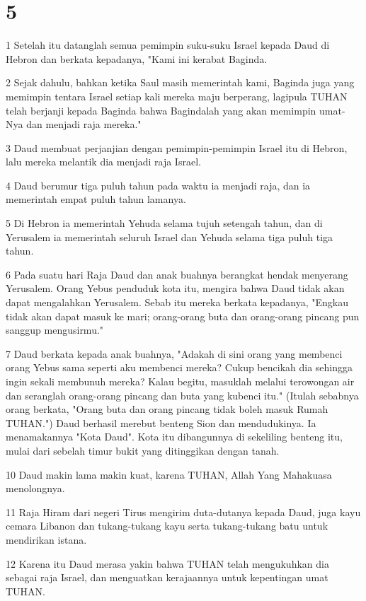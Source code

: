 \chapter{5}

\par 1 Setelah itu datanglah semua pemimpin suku-suku Israel kepada Daud di Hebron dan berkata kepadanya, "Kami ini kerabat Baginda.
\par 2 Sejak dahulu, bahkan ketika Saul masih memerintah kami, Baginda juga yang memimpin tentara Israel setiap kali mereka maju berperang, lagipula TUHAN telah berjanji kepada Baginda bahwa Bagindalah yang akan memimpin umat-Nya dan menjadi raja mereka."
\par 3 Daud membuat perjanjian dengan pemimpin-pemimpin Israel itu di Hebron, lalu mereka melantik dia menjadi raja Israel.
\par 4 Daud berumur tiga puluh tahun pada waktu ia menjadi raja, dan ia memerintah empat puluh tahun lamanya.
\par 5 Di Hebron ia memerintah Yehuda selama tujuh setengah tahun, dan di Yerusalem ia memerintah seluruh Israel dan Yehuda selama tiga puluh tiga tahun.
\par 6 Pada suatu hari Raja Daud dan anak buahnya berangkat hendak menyerang Yerusalem. Orang Yebus penduduk kota itu, mengira bahwa Daud tidak akan dapat mengalahkan Yerusalem. Sebab itu mereka berkata kepadanya, "Engkau tidak akan dapat masuk ke mari; orang-orang buta dan orang-orang pincang pun sanggup mengusirmu."
\par 7 Daud berkata kepada anak buahnya, "Adakah di sini orang yang membenci orang Yebus sama seperti aku membenci mereka? Cukup bencikah dia sehingga ingin sekali membunuh mereka? Kalau begitu, masuklah melalui terowongan air dan seranglah orang-orang pincang dan buta yang kubenci itu." (Itulah sebabnya orang berkata, "Orang buta dan orang pincang tidak boleh masuk Rumah TUHAN.") Daud berhasil merebut benteng Sion dan mendudukinya. Ia menamakannya "Kota Daud". Kota itu dibangunnya di sekeliling benteng itu, mulai dari sebelah timur bukit yang ditinggikan dengan tanah.
\par 10 Daud makin lama makin kuat, karena TUHAN, Allah Yang Mahakuasa menolongnya.
\par 11 Raja Hiram dari negeri Tirus mengirim duta-dutanya kepada Daud, juga kayu cemara Libanon dan tukang-tukang kayu serta tukang-tukang batu untuk mendirikan istana.
\par 12 Karena itu Daud merasa yakin bahwa TUHAN telah mengukuhkan dia sebagai raja Israel, dan menguatkan kerajaannya untuk kepentingan umat TUHAN.
